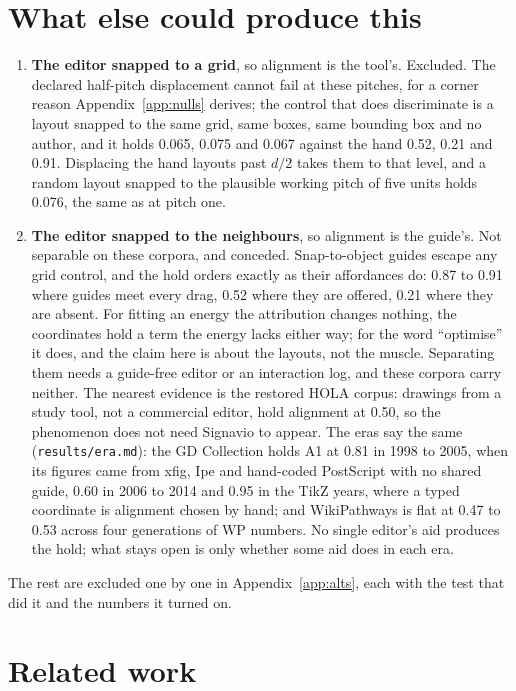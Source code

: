 \documentclass[a4paper,UKenglish]{gd-lipics-v3}
\begin{document}
\section{What else could produce this}\label{sec:alternatives}


\begin{enumerate}
\item \textbf{The editor snapped to a grid}, so alignment is the tool's. Excluded.
  The declared half-pitch displacement cannot fail at these pitches, for a corner reason
  Appendix~\ref{app:nulls} derives; the control that does discriminate is a layout
  snapped to the same grid, same boxes, same bounding box and no author, and it holds
  0.065, 0.075 and 0.067 against the hand 0.52, 0.21 and 0.91. Displacing the hand
  layouts past $d/2$ takes them to that level, and a random layout snapped to the
  plausible working pitch of five units holds 0.076, the same as at pitch one.
\item \textbf{The editor snapped to the neighbours}, so alignment is the guide's. Not
  separable on these corpora, and conceded. Snap-to-object guides escape any grid
  control, and the hold orders exactly as their affordances do: 0.87 to 0.91 where
  guides meet every drag, 0.52 where they are offered, 0.21 where they are absent. For fitting an energy the attribution changes nothing, the coordinates hold a
  term the energy lacks either way; for the word ``optimise'' it does, and the claim here
  is about the layouts, not the muscle. Separating them needs a guide-free editor or an
  interaction log, and these corpora carry neither. The nearest evidence is the restored
  HOLA corpus: drawings from a study tool, not a commercial editor, hold alignment at
  0.50, so the phenomenon does not need Signavio to appear. The eras say the same
  (\texttt{results/era.md}): the GD Collection holds A1 at 0.81 in 1998 to 2005, when
  its figures came from xfig, Ipe and hand-coded PostScript with no shared guide, 0.60
  in 2006 to 2014 and 0.95 in the TikZ years, where a typed coordinate is alignment
  chosen by hand; and WikiPathways is flat at 0.47 to 0.53 across four generations of
  WP numbers. No single editor's aid produces the hold; what stays open is only
  whether some aid does in each era.
\end{enumerate}

The rest are excluded one by one in Appendix~\ref{app:alts}, each with the test that
did it and the numbers it turned on.


\section{Related work}\label{sec:related}
\end{document}

